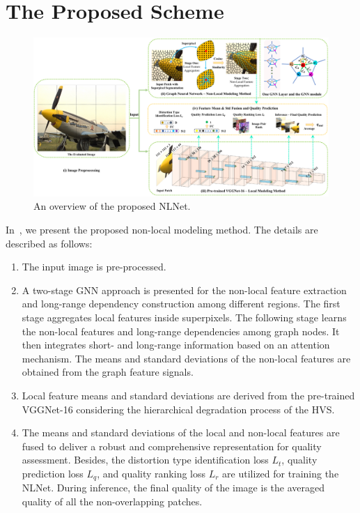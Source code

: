 \section{The Proposed Scheme}
\begin{figure}[ht]
	\centering
	\includegraphics[width=\linewidth]{fig/overview.pdf}
	\caption{An overview of the proposed NLNet.}
	\label{Overview}
\end{figure}

In~, we present the proposed non-local modeling method. The details are described as follows:
\begin{enumerate}[label=\roman*.]
	\item The input image is pre-processed.
	\item A two-stage GNN approach is presented for the non-local feature extraction and long-range dependency construction among different regions. The first stage aggregates local features inside superpixels. The following stage learns the non-local features and long-range dependencies among graph nodes. It then integrates short- and long-range information based on an attention mechanism. The means and standard deviations of the non-local features are obtained from the graph feature signals.
	\item Local feature means and standard deviations are derived from the pre-trained VGGNet-16 considering the hierarchical degradation process of the HVS.
	\item The means and standard deviations of the local and non-local features are fused to deliver a robust and comprehensive representation for quality assessment. Besides, the distortion type identification loss $L_t$, quality prediction loss $L_q$, and quality ranking loss $L_r$ are utilized for training the NLNet. During inference, the final quality of the image is the averaged quality of all the non-overlapping patches.
\end{enumerate}

